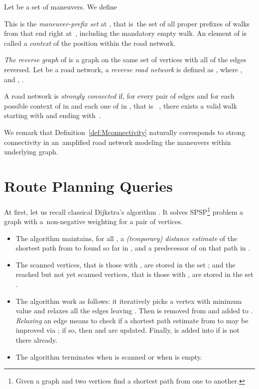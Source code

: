 \documentclass[envcountsect,envcountsame]{llncs}
\begin{document}
\begin{definition}
  \label{def:context}
  Let  be a set of maneuvers. We define 
  
  
  This  is the {\em maneuver-prefix set} at ,
  that is\ the set of all proper prefixes of walks from  that end
  right at~, including the mandatory empty walk.
  An element of  is called a {\em context} of the
  position  within the road network.
\end{definition}


\emph{The reverse graph}  of  is a graph on the same set of vertices 
with all of the edges reversed. Let  be a road network, 
a \emph{reverse road network} is defined as , where 
,  and , .

\begin{definition}
  \label{def:Mconnectivity}
  A road network  is \emph{strongly connected} if, for every 
  pair of edges  and for each possible 
  context  of  in  and each one 
  of  in , that is \ , there exists a valid walk starting with  and 
  ending with~.
\end{definition}

We remark that Definition~\ref{def:Mconnectivity} naturally corresponds to 
strong connectivity in an~amplified road network modeling the maneuvers 
within underlying graph.

\section{Route Planning Queries}
\label{sec:query}

At first, let us recall classical Dijkstra's algorithm \cite{Dijkstra1959}.
It solves SPSP\footnote{Given a graph and two vertices find a shortest path 
from one to another.} problem a graph  with a~non-negative weighting  
for a pair  of vertices.

\begin{itemize}
\parskip 3pt
\item The algorithm maintains, for all , a 
  {\em (temporary) distance estimate} of the shortest path from  to  
  found so far in , and a predecessor of  on that path in . 

\item The scanned vertices, that is those with , 
  are stored in the set ; and the reached but not yet scanned vertices, 
  that is those with , are stored in the set . 

\item The algorithm work as follows: it iteratively picks a vertex  
  with minimum value  and relaxes all the edges  leaving .
  Then  is removed from  and added to . {\em Relaxing} an edge 
  means to check if a shortest path estimate from  to  may be improved 
  via ; if so, then  and  are updated. Finally,  is added 
  into  if is not there already. 

\item The algorithm terminates when  is scanned or when  is empty.
\end{itemize}
\end{document}
